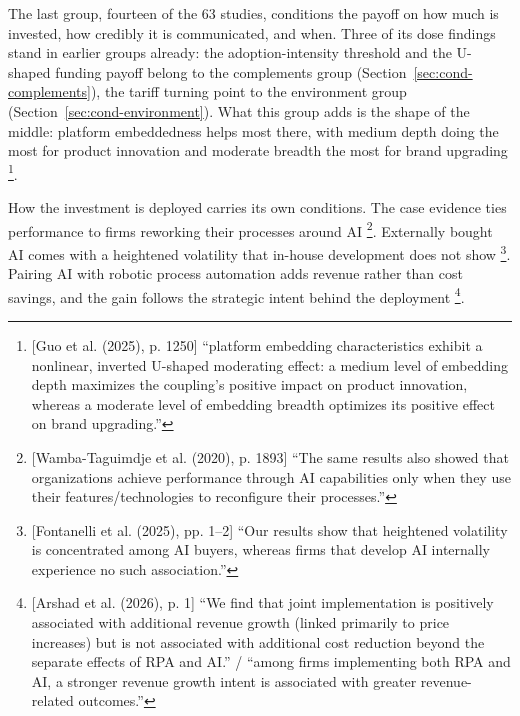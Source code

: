 The last group, fourteen of the 63 studies, conditions the payoff on how much is invested, how credibly it is communicated, and when. Three of its dose findings stand in earlier groups already: the adoption-intensity threshold and the U-shaped funding payoff belong to the complements group (Section~\ref{sec:cond-complements}), the tariff turning point to the environment group (Section~\ref{sec:cond-environment}). What this group adds is the shape of the middle: platform embeddedness helps most there, with medium depth doing the most for product innovation and moderate breadth the most for brand upgrading \parencite[p.~1250]{guo2025cross}\footnote{[Guo et al. (2025), p. 1250] ``platform embedding characteristics exhibit a nonlinear, inverted U-shaped moderating effect: a medium level of embedding depth maximizes the coupling's positive impact on product innovation, whereas a moderate level of embedding breadth optimizes its positive effect on brand upgrading.''}.

How the investment is deployed carries its own conditions. The case evidence ties performance to firms reworking their processes around AI \parencite[p.~1893]{wambataguimdje2020influence}\footnote{[Wamba-Taguimdje et al. (2020), p. 1893] ``The same results also showed that organizations achieve performance through AI capabilities only when they use their features/technologies to reconfigure their processes.''}. Externally bought AI comes with a heightened volatility that in-house development does not show \parencite[pp.~1--2]{fontanelli2025predictive}\footnote{[Fontanelli et al. (2025), pp. 1--2] ``Our results show that heightened volatility is concentrated among AI buyers, whereas firms that develop AI internally experience no such association.''}. Pairing AI with robotic process automation adds revenue rather than cost savings, and the gain follows the strategic intent behind the deployment \parencite[p.~1]{arshad2026making}\footnote{[Arshad et al. (2026), p. 1] ``We find that joint implementation is positively associated with additional revenue growth (linked primarily to price increases) but is not associated with additional cost reduction beyond the separate effects of RPA and AI.'' / ``among firms implementing both RPA and AI, a stronger revenue growth intent is associated with greater revenue-related outcomes.''}.

